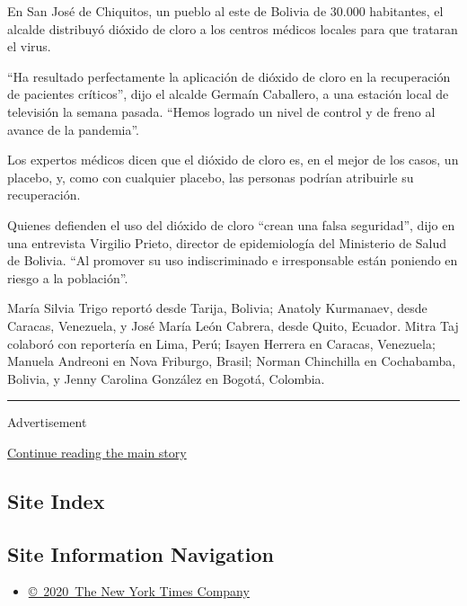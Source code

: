En San José de Chiquitos, un pueblo al este de Bolivia de 30.000
habitantes, el alcalde distribuyó dióxido de cloro a los centros médicos
locales para que trataran el virus.

``Ha resultado perfectamente la aplicación de dióxido de cloro en la
recuperación de pacientes críticos'', dijo el alcalde Germaín Caballero,
a una estación local de televisión la semana pasada. ``Hemos logrado un
nivel de control y de freno al avance de la pandemia''.

Los expertos médicos dicen que el dióxido de cloro es, en el mejor de
los casos, un placebo, y, como con cualquier placebo, las personas
podrían atribuirle su recuperación.

Quienes defienden el uso del dióxido de cloro ``crean una falsa
seguridad'', dijo en una entrevista Virgilio Prieto, director de
epidemiología del Ministerio de Salud de Bolivia. ``Al promover su uso
indiscriminado e irresponsable están poniendo en riesgo a la
población''.

María Silvia Trigo reportó desde Tarija, Bolivia; Anatoly Kurmanaev,
desde Caracas, Venezuela, y José María León Cabrera, desde Quito,
Ecuador. Mitra Taj colaboró con reportería en Lima, Perú; Isayen Herrera
en Caracas, Venezuela; Manuela Andreoni en Nova Friburgo, Brasil; Norman
Chinchilla en Cochabamba, Bolivia, y Jenny Carolina González en Bogotá,
Colombia.

\begin{center}\rule{0.5\linewidth}{\linethickness}\end{center}

Advertisement

\protect\hyperlink{after-bottom}{Continue reading the main story}

\hypertarget{site-index}{%
\subsection{Site Index}\label{site-index}}

\hypertarget{site-information-navigation}{%
\subsection{Site Information
Navigation}\label{site-information-navigation}}

\begin{itemize}
\tightlist
\item
  \href{https://help.nytimes.com/hc/en-us/articles/115014792127-Copyright-notice}{©~2020~The
  New York Times Company}
\end{itemize}

